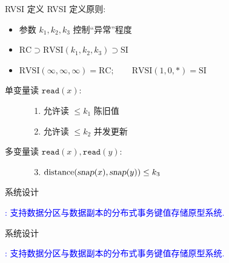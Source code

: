 \begin{frame}{RVSI 定义}
  RVSI 定义原则:
  \begin{itemize}
    \item 参数 $k_1, k_2, k_3$ 控制``异常''程度
    \item $\text{RC} \supset \text{RVSI}(k_1, k_2, k_3) \supset \text{SI}$
    \item $\text{RVSI}(\infty,\infty,\infty) = \text{RC}; \qquad \text{RVSI}(1,0,\ast) = \text{SI}$
  \end{itemize}

  \vspace{0.20cm}

  \begin{cdef}
    \begin{description}
      \item[单变量读 $\texttt{read}(x)$:] \hfill 
        \begin{enumerate}
          \item 允许读 $\le k_1$ 陈旧值
          \item 允许读 $\le k_2$ 并发更新
        \end{enumerate}
      \item[多变量读 $\texttt{read}(x), \texttt{read}{(y)}$:] \hfill
        \begin{enumerate}
          \setcounter{enumi}{2}
		\item $\text{distance}(\textsl{snap}{(x)},\textsl{snap}{(y)}) \le k_3$
        \end{enumerate}
    \end{description}
  \end{cdef}
\end{frame}
\begin{frame}{\chameleon{} 系统设计}
  \centerline{\textcolor{blue}{\chameleon{}: 
	支持数据分区与数据副本的分布式事务键值存储原型系统.}}

\end{frame}
\begin{frame}{\chameleon{} 系统设计}
  \centerline{\textcolor{blue}{\chameleon{}: 
	支持数据分区与数据副本的分布式事务键值存储原型系统.}}

\end{frame}
